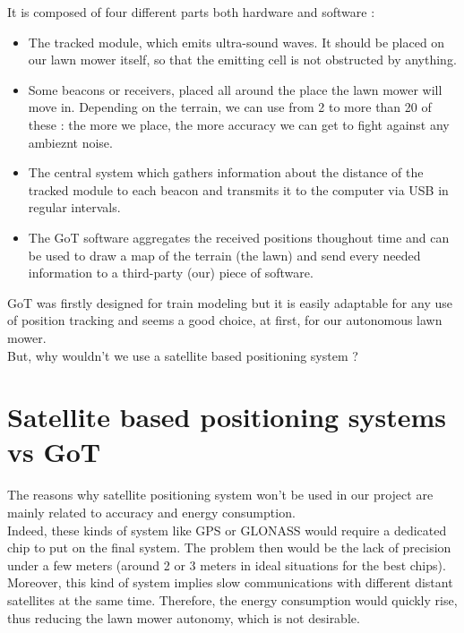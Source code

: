 \noindent
It is composed of four different parts both hardware and software :
\begin{itemize}
	\item The tracked module, which emits ultra-sound waves. It should be placed on our lawn mower itself, so that the emitting cell is not obstructed by anything.
	\item Some beacons or receivers, placed all around the place the lawn mower will move in. Depending on the terrain, we can use from 2 to more than 20 of these : the more we place, the more accuracy we can get to fight against any ambieznt noise.
	\item The central system which gathers information about the distance of the tracked module to each beacon and transmits it to the computer via USB in regular intervals.
	\item The GoT software aggregates the received positions thoughout time and can be used to draw a map of the terrain (the lawn) and send every needed information to a third-party (our) piece of software.
\end{itemize}
GoT was firstly designed for train modeling but it is easily adaptable for any use of position tracking and seems a good choice, at first, for our autonomous lawn mower.\\
But, why wouldn't we use a satellite based positioning system ?

\section{Satellite based positioning systems vs GoT}
The reasons why satellite positioning system won't be used in our project are mainly related to accuracy and energy consumption.\\

\noindent
Indeed, these kinds of system like GPS or GLONASS would require a dedicated chip to put on the final system. The problem then would be the lack of precision under a few meters (around 2 or 3 meters in ideal situations for the best chips). \\

\noindent
Moreover, this kind of system implies slow communications with different distant satellites at the same time. Therefore, the energy consumption would quickly rise, thus reducing the lawn mower autonomy, which is not desirable.

